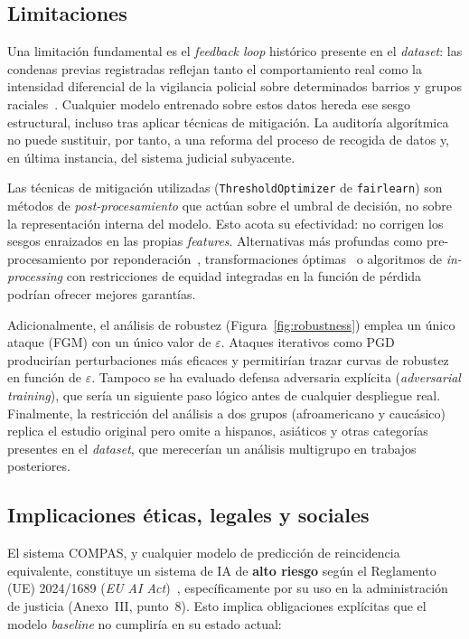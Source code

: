 \documentclass[11pt,a4paper]{article}
\begin{document}
\subsection{Limitaciones}

Una limitación fundamental es el \textit{feedback loop} histórico presente en el \textit{dataset}: las condenas previas registradas reflejan tanto el comportamiento real como la intensidad diferencial de la vigilancia policial sobre determinados barrios y grupos raciales~\cite{angwin2016machine, barocas2019fairness}. Cualquier modelo entrenado sobre estos datos hereda ese sesgo estructural, incluso tras aplicar técnicas de mitigación. La auditoría algorítmica no puede sustituir, por tanto, a una reforma del proceso de recogida de datos y, en última instancia, del sistema judicial subyacente.

Las técnicas de mitigación utilizadas (\texttt{ThresholdOptimizer} de \texttt{fairlearn}) son métodos de \emph{post-procesamiento} que actúan sobre el umbral de decisión, no sobre la representación interna del modelo. Esto acota su efectividad: no corrigen los sesgos enraizados en las propias \textit{features}. Alternativas más profundas como pre-procesamiento por reponderación~\cite{kamiran2012data}, transformaciones óptimas~\cite{calmon2017optimized} o algoritmos de \textit{in-processing} con restricciones de equidad integradas en la función de pérdida~\cite{agarwal2018reductions, zafar2017fairness} podrían ofrecer mejores garantías.

Adicionalmente, el análisis de robustez (Figura~\ref{fig:robustness}) emplea un único ataque (FGM) con un único valor de $\varepsilon$. Ataques iterativos como PGD~\cite{madry2018towards} producirían perturbaciones más eficaces y permitirían trazar curvas de robustez en función de $\varepsilon$. Tampoco se ha evaluado defensa adversaria explícita (\textit{adversarial training}), que sería un siguiente paso lógico antes de cualquier despliegue real. Finalmente, la restricción del análisis a dos grupos (afroamericano y caucásico) replica el estudio original pero omite a hispanos, asiáticos y otras categorías presentes en el \textit{dataset}, que merecerían un análisis multigrupo en trabajos posteriores.

\subsection{Implicaciones éticas, legales y sociales}

El sistema COMPAS, y cualquier modelo de predicción de reincidencia equivalente, constituye un sistema de IA de \textbf{alto riesgo} según el Reglamento (UE) 2024/1689 (\textit{EU AI Act})~\cite{eu_ai_act_2024}, específicamente por su uso en la administración de justicia (Anexo~III, punto~8). Esto implica obligaciones explícitas que el modelo \textit{baseline} no cumpliría en su estado actual:
\end{document}
